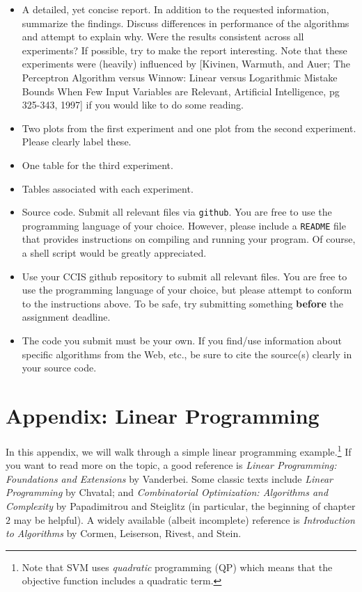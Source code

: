\documentclass[12pt,letterpaper]{article}
\begin{document}
\begin{enumerate}
\begin{itemize}
\item
A detailed, yet concise report.  In addition to the requested information, summarize the findings.  Discuss differences in performance of the algorithms and attempt to explain why.  Were the results consistent across all experiments?  If possible, try to make the report interesting.  Note that these experiments were (heavily) influenced by [Kivinen, Warmuth, and Auer; The Perceptron Algorithm versus Winnow: Linear versus Logarithmic Mistake Bounds When Few Input Variables are Relevant, Artificial Intelligence, pg 325-343, 1997] if you would like to do some reading.
\item
Two plots from the first experiment and one plot from the second experiment.  Please clearly label these.
\item
One table for the third experiment.
\item
Tables associated with each experiment.
\item
Source code.  Submit all relevant files via {\tt github}.  You are free to use the programming language of your choice.  However, please include a {\tt README} file that provides instructions on compiling and running your program.  Of course, a shell script would be greatly appreciated.

\item
Use your CCIS github repository to submit all relevant files.  You are free to use the programming language of your choice, but please attempt to conform to the instructions above.  To be safe, try submitting something {\bf before} the assignment deadline.

\item
The code you submit must be your own. If you find/use information about specific algorithms from the Web, etc., be sure to cite the source(s) clearly in your source code. 
\end{itemize}

\end{enumerate}

\section*{Appendix: Linear Programming}

In this appendix, we will walk through a simple linear programming example.\footnote{Note that SVM uses {\em quadratic} programming (QP) which means that the objective function includes a quadratic term.}  If you want to read more on the topic, a good reference is {\em Linear Programming: Foundations and Extensions} by Vanderbei.  Some classic texts include {\em Linear Programming} by Chvatal; and {\em Combinatorial Optimization: Algorithms and Complexity} by Papadimitrou and Steiglitz (in particular, the beginning of chapter $2$ may be helpful).  A widely available (albeit incomplete) reference is {\em Introduction to Algorithms} by Cormen, Leiserson, Rivest, and Stein.
\end{document}
